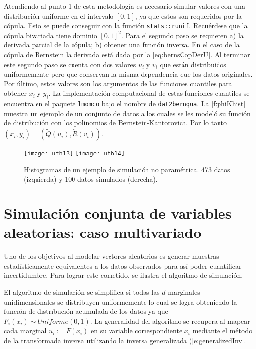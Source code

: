Atendiendo al punto 1 de esta metodolog\'ia es necesario simular valores con una distribuci\'on uniforme en el intervalo \(\left\lbrack 0,1 \right\rbrack\), ya que estos son requeridos por la c\'opula. Esto se puede conseguir con la funci\'on \verb|stats::runif|. Recu\'erdese que la c\'opula bivariada tiene dominio \(\left\lbrack 0,1 \right\rbrack^{2}\).
Para el segundo paso se requieren a) la  derivada parcial de la c\'opula; b) obtener una funci\'on inversa.
En el caso de la c\'opula de Bernstein la derivada est\'a dada por la \autoref{eq:bernsCopDerU}.
Al terminar este segundo paso se cuenta con dos valores $u_i$ y $v_i$ que est\'an distribuidos uniformemente pero que conservan la misma dependencia que los datos originales.
Por \'ultimo, estos valores son los argumentos de las funciones cuantiles para obtener $x_i$ y $y_i$. 
La implementaci\'on computacional de estas funciones cuantiles se encuentra en el paquete \verb|lmomco| bajo el nombre de \verb|dat2bernqua|.
La \autoref{f:phiKhist} muestra un ejemplo de un conjunto de datos a los cuales se les model\'o su funci\'on de distribuci\'on con los polinomios de Bernstein-Kantorovich. Por lo tanto
$(x_{i},y_{i}) = (\tilde{Q}(u_{i}), \tilde{R}(v_{i}))$.

\begin{figure}[H]
	\centering
\texttt{[image: utb13]}
\texttt{[image: utb14]}
\caption{Histogramas de un ejemplo de simulaci\'on no param\'etrica. 473 datos (izquierda) y 100 datos simulados (derecha).}
\label{f:phiKhist}
\end{figure}

\section{Simulaci\'on conjunta de variables aleatorias: caso multivariado}

Uno de los objetivos al modelar vectores aleatorios es generar muestras estad\'{i}sticamente equivalentes a los datos observados para as\'{i} poder cuantificar incertidumbre. Para lograr este cometido, se ilustra el algoritmo de simulaci\'{o}n.

El algoritmo de simulaci\'{o}n se simplifica si todas las $d$ marginales unidimensionales se distribuyen uniformemente lo cual se logra obteniendo la funci\'{o}n de distribuci\'{o}n acumulada de los datos ya que $F_i(x_i) \sim Uniforme(0,1)$. La generalidad del algoritmo se recupera al mapear cada marginal $u_{i} := F(x_i)$ en su variable correspondiente $x_{i}$ mediante el m\'etodo de la transformada inversa \citep[sec. 2.1.2, pp. 44]{robert_introducing_2009} utilizando la inversa generalizada (\autoref{e:generalizedInv}.

